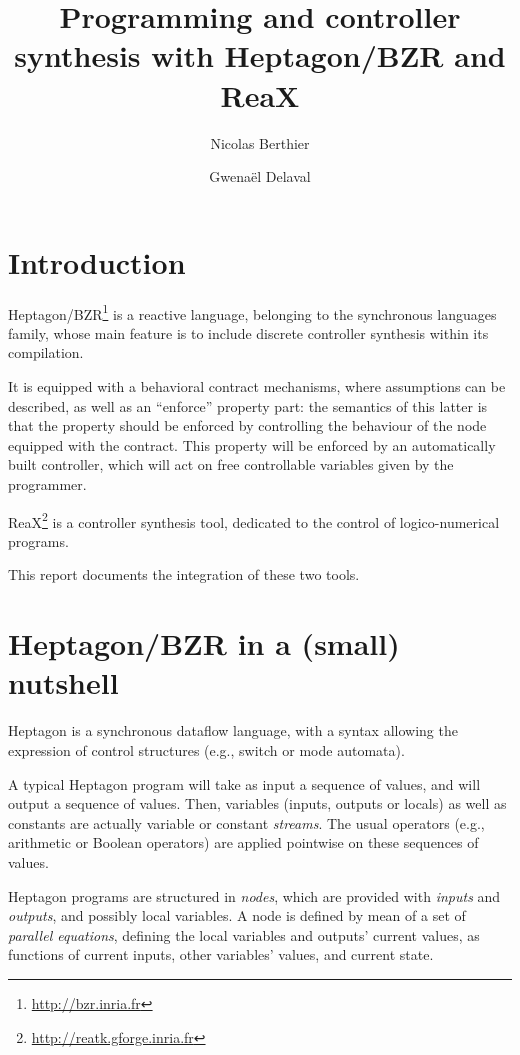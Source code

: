 \documentclass[a4paper]{article}
\title{Programming and controller synthesis with Heptagon/BZR and ReaX}
\author{Nicolas Berthier \and Gwenaël Delaval}
\date{}
\begin{document}
\maketitle

\section{Introduction}

Heptagon/BZR\footnote{\url{http://bzr.inria.fr}}\cite{delaval13:bzr_jdeds}
is a reactive language, belonging to the synchronous languages family,
whose main feature is to include discrete controller synthesis within
its compilation.

It is equipped with a behavioral contract mechanisms, where
assumptions can be described, as well as an ``enforce'' property part:
the semantics of this latter is that the property should be enforced
by controlling the behaviour of the node equipped with the
contract. This property will be enforced by an automatically built
controller, which will act on free controllable variables given by the
programmer.

ReaX\footnote{\url{http://reatk.gforge.inria.fr}}\cite{berthier14:_reax}
is a controller synthesis tool, dedicated to the control of
logico-numerical programs.

This report documents the integration of these two tools.

\section{Heptagon/BZR in a (small) nutshell}

Heptagon is a synchronous dataflow language, with a syntax allowing the
expression of control structures (e.g., switch or mode automata).

A typical Heptagon program will take as input a sequence of values,
and will output a sequence of values. Then, variables (inputs, outputs
or locals) as well as constants are actually variable or constant
\emph{streams}. The usual operators (e.g., arithmetic or Boolean
operators) are applied pointwise on these sequences of values.

Heptagon programs are structured in \emph{nodes}, which are provided
with \emph{inputs} and \emph{outputs}, and possibly local variables. A
node is defined by mean of a set of \emph{parallel equations},
defining the local variables and outputs' current values, as functions
of current inputs, other variables' values, and current state.
\end{document}
